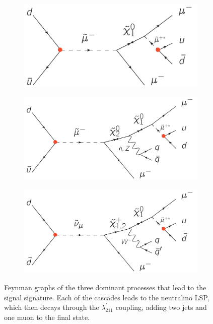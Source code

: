 \begin{figure}[htb!]
  \centering
  \begin{subfigure}[b]{0.495\textwidth}
    \centering
    \includegraphics[width=\textwidth]{plots/rpv-resonant-smuon-samesign-mumuqq.pdf}
    \caption{\label{fig:resosmuneut1}}
  \end{subfigure}
  \begin{subfigure}[b]{0.495\textwidth}
    \centering
    \includegraphics[width=\textwidth]{plots/rpv-resonant-smuon-neutralino2.pdf}
    \caption{\label{fig:resosmuneut2}}
  \end{subfigure}

  \begin{subfigure}[b]{0.495\textwidth}
    \centering
    \includegraphics[width=\textwidth]{plots/rpv-resonant-sneutrino-chargino-mumuqq.pdf}
    \caption{\label{fig:resosneutcharg1}}
  \end{subfigure}

  \caption{Feynman graphs of the three dominant processes that lead to the signal signature. Each of the cascades leads to the neutralino LSP, which then decays through the $\lambda^\prime_{211}$ coupling, adding two jets and one muon to the final state.}
  \label{fig:domprocesses}
\end{figure}

